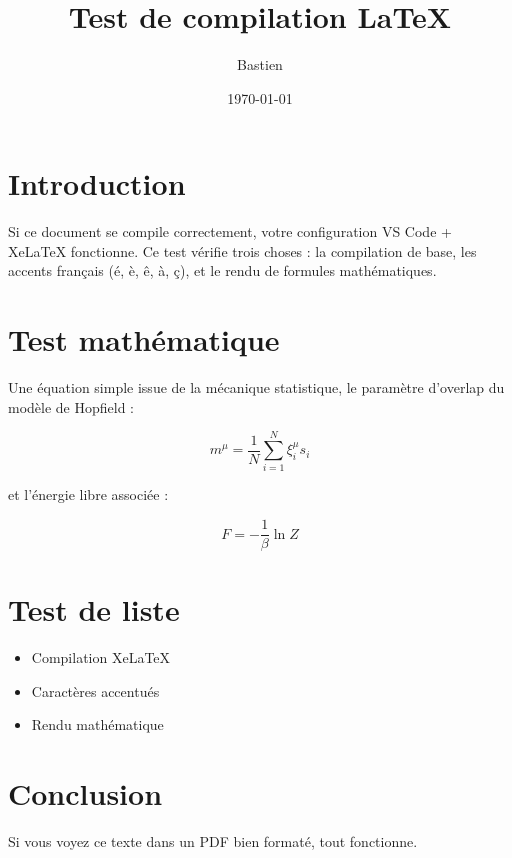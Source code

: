 \documentclass{article}
\title{Test de compilation LaTeX}
\author{Bastien}
\date{\today}
\begin{document}
\maketitle

\section{Introduction}
Si ce document se compile correctement, votre configuration VS Code + XeLaTeX fonctionne. Ce test vérifie trois choses : la compilation de base, les accents français (é, è, ê, à, ç), et le rendu de formules mathématiques.

\section{Test mathématique}
Une équation simple issue de la mécanique statistique, le paramètre d'overlap du modèle de Hopfield :

\begin{equation}
m^\mu = \frac{1}{N} \sum_{i=1}^{N} \xi_i^\mu s_i
\end{equation}

et l'énergie libre associée :

\begin{equation}
F = -\frac{1}{\beta} \ln Z
\end{equation}

\section{Test de liste}
\begin{itemize}
    \item Compilation XeLaTeX
    \item Caractères accentués
    \item Rendu mathématique
\end{itemize}

\section{Conclusion}
Si vous voyez ce texte dans un PDF bien formaté, tout fonctionne.
\end{document}
